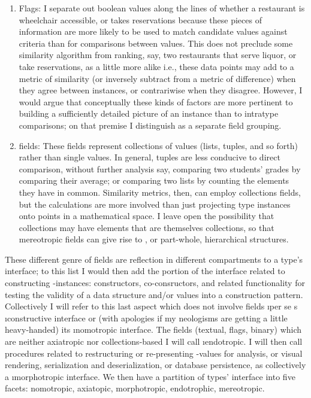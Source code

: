 {\begin{enumerate}
given \ty{}-axiatrope projects I call an \i{axiatropic image}.  
If desired, axes can be annotated with details such as 
valid ranges and units of measurement (consistent 
with, for instance, Conceptual Space Markup Language).
\item{} Flags: I separate out boolean values 
\mdash{} along the lines of whether a restaurant is wheelchair 
accessible, or takes reservations \mdash{} because these pieces 
of information are more likely to be used to match 
candidate values against criteria than for comparisons 
between values.  This does not preclude some similarity 
algorithm from ranking, say, two restaurants that serve 
liquor, or take reservations, as a little more alike  
\mdash{} i.e., these data points may add to a metric 
of similarity (or inversely subtract from a metric of 
difference) when they agree between instances, or 
contrariwise when they disagree.  However, I would 
argue that conceptually these kinds of factors are 
more pertinent to building a sufficiently detailed 
picture of an instance than to intratype comparisons; 
on that premise I distinguish  as a 
separate field grouping.    
\item{}  fields: These fields represent 
collections of values (lists, tuples, and so forth) rather than 
single values.  In general, tuples are less conducive 
to direct comparison, without further analysis 
\mdash{} say, comparing two students' grades by comparing 
their average; or comparing two lists by counting 
the elements they have in common.  Similarity 
metrics, then, can employ collections fields, 
but the calculations are more involved than just projecting 
type instances onto points in a mathematical space.  
I leave open the possibility that collections may 
have elements that are themselves collections, so that 
mereotropic fields can give rise to , 
or part-whole, hierarchical structures.
\end{enumerate} 
These different genre of fields are reflection in 
different compartments to a type's interface; 
to this list I would then add the 
portion of the interface related to 
constructing \ty{}-instances: constructors, 
co-consructors, and related functionality for 
testing the validity of a data structure and/or 
 values into a construction 
pattern.  Collectively I will refer to 
this last aspect \mdash{} which does not involve 
fields \i{per se} \mdash{} \ty{}s \i{constructive interface} 
or (with apologies if my neologisms are getting a 
little heavy-handed) its \i{nomotropic interface}.  
The fields (textual, flags, binary) which are 
neither axiatropic nor collections-based I will 
call \i{endotropic}.  I will then call 
procedures related to restructuring or re-presenting 
\ty{}-values for analysis, \GUI{} or visual 
rendering, serialization and deserialization, 
or database persistence, as collectively 
a \i{morphotropic} interface.  We then have a partition 
of types' interface into five facets: 
nomotropic, axiatopic, morphotropic, endotrophic, mereotropic.
}
